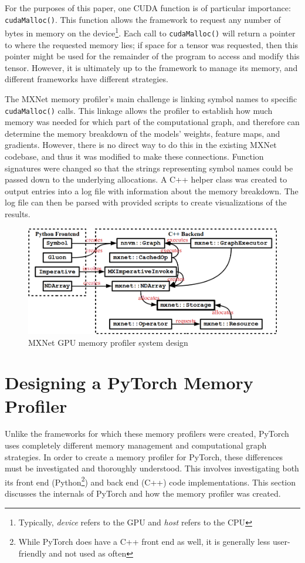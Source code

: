 \documentclass[12pt,letterpaper]{article}
\begin{document}
For the purposes of this paper, one CUDA function is of particular importance: \texttt{cudaMalloc()}. This function allows the framework to request any number of bytes in memory on the device\footnote{Typically, \textit{device} refers to the GPU and \textit{host} refers to the CPU}. Each call to \texttt{cudaMalloc()} will return a pointer to where the requested memory lies; if space for a tensor was requested, then this pointer might be used for the remainder of the program to access and modify this tensor. However, it is ultimately up to the framework to manage its memory, and different frameworks have different strategies. 
\par 

The MXNet memory profiler's main challenge is linking symbol names to specific \texttt{cudaMalloc()} calls. This linkage allows the profiler to establish how much memory was needed for which part of the computational graph, and therefore can determine the memory breakdown of the models' weights, feature maps, and gradients. However, there is no direct way to do this in the existing MXNet codebase, and thus it was modified to make these connections. Function signatures were changed so that the strings representing symbol names could be passed down to the underlying allocations. A C++ helper class was created to output entries into a log file with information about the memory breakdown. The log file can then be parsed with provided scripts to create visualizations of the results.
\par 

\begin{figure}[ht]
\centering
\includegraphics[width=.8\textwidth]{mxnet_profiler_design.png}
\captionsetup{width=0.7\linewidth}
\caption{MXNet GPU memory profiler system design \cite{mxnet_profiler}}
\label{fig:mxnet_design}
\end{figure}
\newpage

\section{Designing a PyTorch Memory Profiler}
\label{progress_to_date}
Unlike the frameworks for which these memory profilers were created, PyTorch uses completely different memory management and computational graph strategies. In order to create a memory profiler for PyTorch, these differences must be investigated and thoroughly understood. This involves investigating both its front end (Python\footnote{While PyTorch does have a C++ front end as well, it is generally less user-friendly and not used as often}) and back end (C++) code implementations. This section discusses the internals of PyTorch and how the memory profiler was created.
\end{document}
